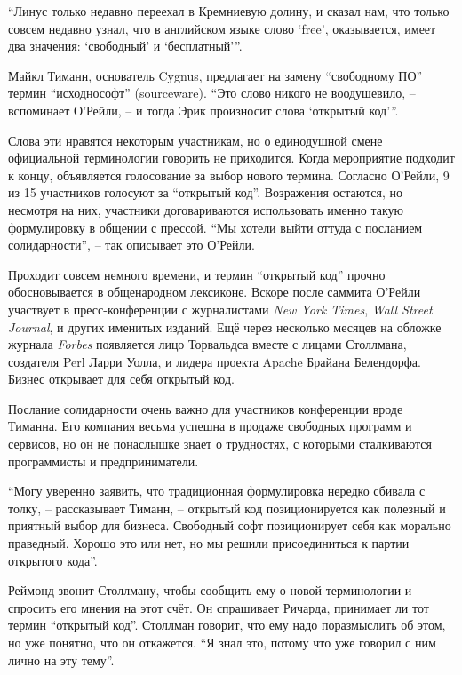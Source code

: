 \enquote{Линус только недавно переехал в Кремниевую долину, и сказал нам, что только совсем недавно узнал, что в английском языке слово \enquote{free}, оказывается, имеет два значения: \enquote{свободный} и \enquote{бесплатный}}.

Майкл Тиманн, основатель Cygnus, предлагает на замену \enquote{свободному ПО} термин \enquote{исходнософт} (sourceware). \enquote{Это слово никого не воодушевило, -- вспоминает О'Рейли, -- и тогда Эрик произносит слова \enquote{открытый код}\hspace{0.01in}}.

Слова эти нравятся некоторым участникам, но о единодушной смене официальной терминологии говорить не приходится. Когда мероприятие подходит к концу, объявляется голосование за выбор нового термина. Согласно О'Рейли, 9 из 15 участников голосуют за \enquote{открытый код}. Возражения остаются, но несмотря на них, участники договариваются использовать именно такую формулировку в общении с прессой. \enquote{Мы хотели выйти оттуда с посланием солидарности}, -- так описывает это О'Рейли.

Проходит совсем немного времени, и термин \enquote{открытый код} прочно обосновывается в общенародном лексиконе. Вскоре после саммита О'Рейли участвует в пресс-конференции с журналистами \textit{New York Times}, \textit{Wall Street Journal}, и других именитых изданий. Ещё через несколько месяцев на обложке журнала \textit{Forbes} появляется лицо Торвальдса вместе с лицами Столлмана, создателя Perl Ларри Уолла, и лидера проекта Apache Брайана Белендорфа. Бизнес открывает для себя открытый код.

Послание солидарности очень важно для участников конференции вроде Тиманна. Его компания весьма успешна в продаже свободных программ и сервисов, но он не понаслышке знает о трудностях, с которыми сталкиваются программисты и предприниматели.

\enquote{Могу уверенно заявить, что традиционная формулировка нередко сбивала с толку, -- рассказывает Тиманн, -- открытый код позиционируется как полезный и приятный выбор для бизнеса. Свободный софт позиционирует себя как морально праведный. Хорошо это или нет, но мы решили присоединиться к партии открытого кода}.

Реймонд звонит Столлману, чтобы сообщить ему о новой терминологии и спросить его мнения на этот счёт. Он спрашивает Ричарда, принимает ли тот термин \enquote{открытый код}. Столлман говорит, что ему надо поразмыслить об этом, но уже понятно, что он откажется. \enquote{Я знал это, потому что уже говорил с ним лично на эту тему}.

